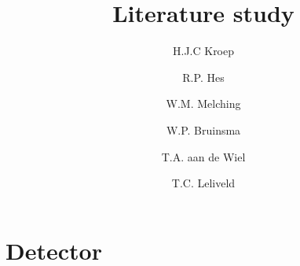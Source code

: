 \documentclass[report]{memoir}
\title{Literature study}
\author{H.J.C Kroep \and R.P. Hes \and W.M. Melching \and W.P. Bruinsma \and T.A. aan de Wiel \and T.C. Leliveld}
\begin{document}
\mainmatter
\chapter{Detector}
\end{document}
